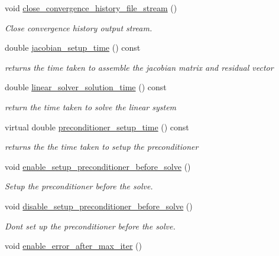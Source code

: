 \begin{DoxyCompactItemize}
void \hyperlink{classoomph_1_1IterativeLinearSolver_a27ef8fa59ce805c221a577c6b9bb56c7}{close\+\_\+convergence\+\_\+history\+\_\+file\+\_\+stream} ()
\begin{DoxyCompactList}\small\item\em Close convergence history output stream. \end{DoxyCompactList}\item 
double \hyperlink{classoomph_1_1IterativeLinearSolver_aed10c606a26c8084e1fa482f3409f9b3}{jacobian\+\_\+setup\+\_\+time} () const
\begin{DoxyCompactList}\small\item\em returns the time taken to assemble the jacobian matrix and residual vector \end{DoxyCompactList}\item 
double \hyperlink{classoomph_1_1IterativeLinearSolver_a65544b6c2090d3d019f48e047e338352}{linear\+\_\+solver\+\_\+solution\+\_\+time} () const
\begin{DoxyCompactList}\small\item\em return the time taken to solve the linear system \end{DoxyCompactList}\item 
virtual double \hyperlink{classoomph_1_1IterativeLinearSolver_a87eb959944a3e8efa467d60aed43a0d3}{preconditioner\+\_\+setup\+\_\+time} () const
\begin{DoxyCompactList}\small\item\em returns the the time taken to setup the preconditioner \end{DoxyCompactList}\item 
void \hyperlink{classoomph_1_1IterativeLinearSolver_a448830993c9046443cfa7479901cc307}{enable\+\_\+setup\+\_\+preconditioner\+\_\+before\+\_\+solve} ()
\begin{DoxyCompactList}\small\item\em Setup the preconditioner before the solve. \end{DoxyCompactList}\item 
void \hyperlink{classoomph_1_1IterativeLinearSolver_adbbfd63d0da5f82abc6cd1143fa5a9b0}{disable\+\_\+setup\+\_\+preconditioner\+\_\+before\+\_\+solve} ()
\begin{DoxyCompactList}\small\item\em Don\textquotesingle{}t set up the preconditioner before the solve. \end{DoxyCompactList}\item 
void \hyperlink{classoomph_1_1IterativeLinearSolver_a68983fd17ca417843b9ba3f810dbdc99}{enable\+\_\+error\+\_\+after\+\_\+max\+\_\+iter} ()

\end{DoxyCompactItemize}
